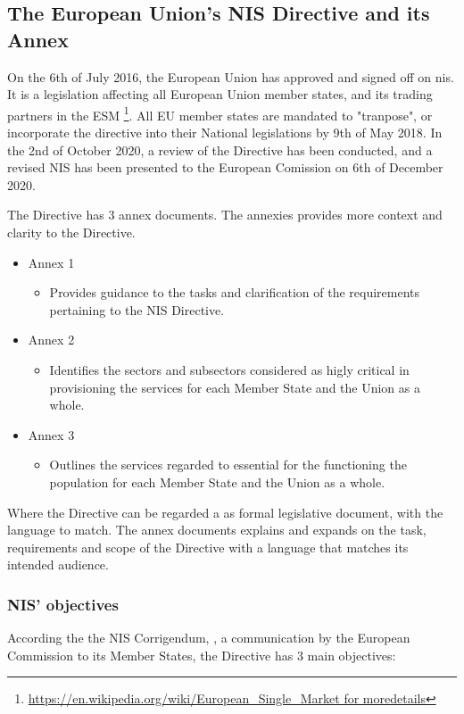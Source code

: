 \subsection{The European Union's NIS Directive and its Annex}

On the 6th of July 2016, the European Union has approved and signed off on \acrfull{nis}. It is a legislation affecting all European Union member states, and its trading partners in the \Gls{ESM} \footnote[2]{\url{https://en.wikipedia.org/wiki/European_Single_Market for moredetails}}. All EU member states are mandated to "tranpose", or incorporate the directive into their National legislations by 9th of May 2018. In the 2nd of October 2020, a review of the Directive has been conducted, and a revised NIS has been presented to the European Comission on 6th of December 2020.

The Directive has 3 annex documents. The annexies provides more context and clarity to the Directive.

\begin{itemize}
    \item Annex 1
        \begin{itemize}
            \item Provides guidance to the tasks and clarification of the requirements pertaining to the NIS Directive.
        \end{itemize}    
    \item Annex 2
        \begin{itemize}
            \item Identifies the sectors and subsectors considered as higly critical in provisioning the services for each Member State and the Union as a whole.
        \end{itemize}
    \item Annex 3
        \begin{itemize}
            \item Outlines the services regarded to essential for the functioning the population for each Member State and the Union as a whole.
        \end{itemize}
\end{itemize}

Where the Directive can be regarded a as formal legislative document, with the language to match. The annex documents explains and expands on the task, requirements and scope of the Directive with a language that matches its intended audience.

\subsubsection{NIS' objectives}
According the the NIS Corrigendum, \cite{EuropeanCommission2017} , a communication by the European Commission to its Member States, the Directive has 3 main objectives:

